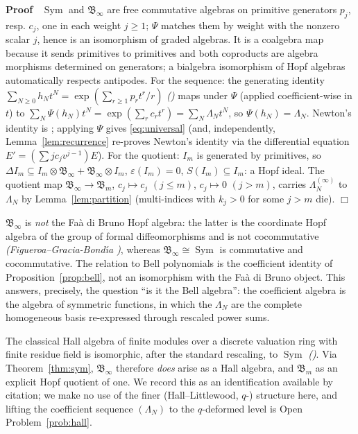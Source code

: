 \documentclass{article}
\newcommand{\tmem}[1]{{\em #1\/}}
\newcommand{\tmop}[1]{\ensuremath{\operatorname{#1}}}
\newenvironment{proof}{\noindent\textbf{Proof\ }}{\hspace*{\fill}$\Box$\medskip}
\newcommand{\Sym}{\tmop{Sym}}
\newcommand{\CA}{\mathfrak{B}}
\begin{document}
\begin{proof}
  $\Sym$ and $\CA_{\infty}$ are free commutative algebras on primitive
  generators $p_j$, resp. $c_j$, one in each weight $j \ge 1$; $\Psi$ matches
  them by weight with the nonzero scalar $j$, hence is an isomorphism of
  graded algebras. It is a coalgebra map because it sends primitives to
  primitives and both coproducts are algebra morphisms determined on
  generators; a bialgebra isomorphism of Hopf algebras automatically respects
  antipodes. For the sequence: the generating identity $\sum_{N \ge 0} h_N t^N
  = \exp \left( \sum_{r \ge 1} p_r t^r / r \right)$
  {\tmem{({\cite[I.(2.10)]{Macdonald}})}} maps under $\Psi$ (applied
  coefficient-wise in $t$) to $\sum_N \Psi (h_N) t^N = \exp \left( \sum_r c_r
  t^r \right) = \sum_N \Lambda_N t^N$, so $\Psi (h_N) = \Lambda_N$. Newton's
  identity is {\cite[I.(2.11)$'$]{Macdonald}}; applying $\Psi$ gives
  \eqref{eq:universal} (and, independently, Lemma~\ref{lem:recurrence}
  re-proves Newton's identity via the differential equation $E' = (\sum jc_j
  v^{j - 1}) E$). For the quotient: $I_m$ is generated by primitives, so
  $\Delta I_m \subseteq I_m \otimes \CA_{\infty} + \CA_{\infty} \otimes I_m$,
  $\varepsilon (I_m) = 0$, $S (I_m) \subseteq I_m$: a Hopf ideal. The quotient
  map $\CA_{\infty} \to \CA_m$, $c_j \mapsto c_j$ $(j \le m)$, $c_j \mapsto 0$
  $(j > m)$, carries $\Lambda_N^{(\infty)}$ to $\Lambda_N$ by
  Lemma~\ref{lem:partition} (multi-indices with $k_j > 0$ for some $j > m$
  die).
\end{proof}

\begin{remark}
  \label{rem:notFdB}$\CA_{\infty}$ is {\tmem{not}} the Fa{\`a} di Bruno Hopf
  algebra: the latter is the coordinate Hopf algebra of the group of formal
  diffeomorphisms and is not cocommutative
  {\tmem{(Figueroa--Gracia-Bond{\'\i}a {\cite{FGB}})}}, whereas $\CA_{\infty}
  \cong \Sym$ is commutative and cocommutative. The relation to Bell
  polynomials is the coefficient identity of Proposition~\ref{prop:bell}, not
  an isomorphism with the Fa{\`a} di Bruno object. This answers, precisely,
  the question ``is it the Bell algebra'': the coefficient algebra is the
  algebra of symmetric functions, in which the $\Lambda_N$ are the complete
  homogeneous basis re-expressed through rescaled power sums.
\end{remark}

\begin{remark}
  \label{rem:hall} The classical Hall algebra of finite modules
  over a discrete valuation ring with finite residue field is isomorphic,
  after the standard rescaling, to $\Sym$
  {\tmem{({\cite[Ch.~II--III]{Macdonald}})}}. Via Theorem~\ref{thm:sym},
  $\CA_{\infty}$ therefore {\tmem{does}} arise as a Hall algebra, and $\CA_m$
  as an explicit Hopf quotient of one. We record this as an identification
  available by citation; we make no use of the finer (Hall--Littlewood, $q$-)
  structure here, and lifting the coefficient sequence $(\Lambda_N)$ to the
  $q$-deformed level is Open Problem~\ref{prob:hall}.
\end{remark}
\end{document}
